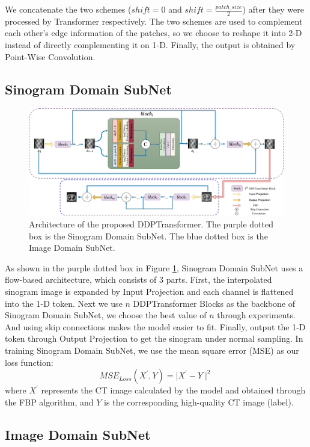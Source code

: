 \documentclass[lettersize,journal]{IEEEtran}
\begin{document}
We concatenate the two schemes ($shift=0$ and $shift=\frac{patch\_size}{2}$) after they were processed by Transformer respectively. The two schemes are used to complement each other's edge information of the patches, so we choose to reshape it into 2-D instead of directly complementing it on 1-D. Finally, the output is obtained by Point-Wise Convolution\cite{2017Xception}.

\subsection{Sinogram Domain SubNet}
\begin{figure}[!t]
	\centering
	\includegraphics[width=7in]{4.eps}
	\caption{Architecture of the proposed DDPTransformer. The purple dotted box is the Sinogram Domain SubNet. The blue dotted box is the Image Domain SubNet.}
	\label{fig4}
\end{figure}

As shown in the purple dotted box in Figure \ref{fig4}, Sinogram Domain SubNet uses a flow-based architecture, which consists of 3 parts. First, the interpolated sinogram image is expanded by Input Projection and each channel is flattened into the 1-D token. Next we use $n$ DDPTransformer Blocks as the backbone of Sinogram Domain SubNet, we choose the best value of $n$ through experiments. And using skip connections makes the model easier to fit. Finally, output the 1-D token through Output Projection to get the sinogram under normal sampling. In training Sinogram Domain SubNet, we use the mean square error (MSE) as our loss function:
\begin{equation}
MSE_{Loss}(X^{'},Y) = \mid X^{'}-Y\mid^{2}
\end{equation}
where $X^{'}$ represents the CT image calculated by the model and obtained through the FBP algorithm, and $Y$ is the corresponding high-quality CT image (label).

\subsection{Image Domain SubNet}
\end{document}
